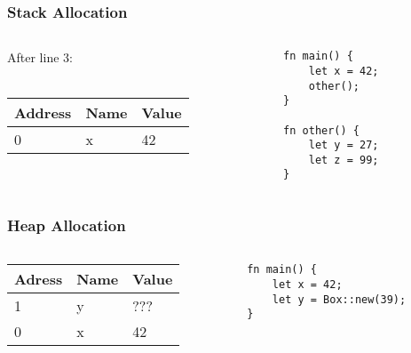 \documentclass{beamer}
\begin{document}
\begin{frame}[fragile]
	\frametitle{Stack Allocation}
	\begin{columns}[T, c]
		\begin{column}{0.48\textwidth}
			After line 3: \\~\\
			\begin{tabular}{| l | l | l |}
				\hline
				Address & Name & Value \\ \hline
				0 & x & 42 \\ \hline
			\end{tabular}
		\end{column}
		\begin{column}{0.48\textwidth}
			\begin{verbatim}
fn main() {
	let x = 42;
	other();
}

fn other() {
	let y = 27;
	let z = 99;
}
			\end{verbatim}
		\end{column}
	\end{columns}
\end{frame}
\begin{frame}[fragile]
	\frametitle{Heap Allocation}
	\begin{columns}[T, c]
		\begin{column}{0.48\textwidth}
			\begin{tabular}{| l | l | l |}
				\hline
				Adress & Name & Value  \\ \hline
				1 & y & ??? \\ \hline
				0 & x & 42 \\ \hline
			\end{tabular}
		\end{column}
		\begin{column}{0.48\textwidth}
			\begin{verbatim}
fn main() {
	let x = 42;
	let y = Box::new(39);
}
			\end{verbatim}
		\end{column}
	\end{columns}
\end{frame}
\end{document}
